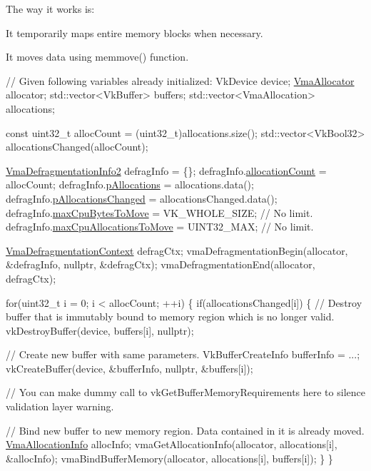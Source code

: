 The way it works is\+:


\begin{DoxyItemize}
\item It temporarily maps entire memory blocks when necessary.
\item It moves data using {\ttfamily memmove()} function.
\end{DoxyItemize}


\begin{DoxyCode}
\textcolor{comment}{// Given following variables already initialized:}
VkDevice device;
\hyperlink{structVmaAllocator}{VmaAllocator} allocator;
std::vector<VkBuffer> buffers;
std::vector<VmaAllocation> allocations;


\textcolor{keyword}{const} uint32\_t allocCount = (uint32\_t)allocations.size();
std::vector<VkBool32> allocationsChanged(allocCount);

\hyperlink{structVmaDefragmentationInfo2}{VmaDefragmentationInfo2} defragInfo = \{\};
defragInfo.\hyperlink{structVmaDefragmentationInfo2_a3cf86ab32c1da779b4923d301a3056ba}{allocationCount} = allocCount;
defragInfo.\hyperlink{structVmaDefragmentationInfo2_a8943f8d65969ce8e2189a1cdf3205e96}{pAllocations} = allocations.data();
defragInfo.\hyperlink{structVmaDefragmentationInfo2_a76d51a644dc7f5405d0cdd0025ecd0cc}{pAllocationsChanged} = allocationsChanged.data();
defragInfo.\hyperlink{structVmaDefragmentationInfo2_af78e1ea40c22d85137b65f6b384a4d0a}{maxCpuBytesToMove} = VK\_WHOLE\_SIZE; \textcolor{comment}{// No limit.}
defragInfo.\hyperlink{structVmaDefragmentationInfo2_a94c2c7223d52878445a8cccce396b671}{maxCpuAllocationsToMove} = UINT32\_MAX; \textcolor{comment}{// No limit.}

\hyperlink{structVmaDefragmentationContext}{VmaDefragmentationContext} defragCtx;
vmaDefragmentationBegin(allocator, &defragInfo, \textcolor{keyword}{nullptr}, &defragCtx);
vmaDefragmentationEnd(allocator, defragCtx);

\textcolor{keywordflow}{for}(uint32\_t i = 0; i < allocCount; ++i)
\{
    \textcolor{keywordflow}{if}(allocationsChanged[i])
    \{
        \textcolor{comment}{// Destroy buffer that is immutably bound to memory region which is no longer valid.}
        vkDestroyBuffer(device, buffers[i], \textcolor{keyword}{nullptr});

        \textcolor{comment}{// Create new buffer with same parameters.}
        VkBufferCreateInfo bufferInfo = ...;
        vkCreateBuffer(device, &bufferInfo, \textcolor{keyword}{nullptr}, &buffers[i]);

        \textcolor{comment}{// You can make dummy call to vkGetBufferMemoryRequirements here to silence validation layer
       warning.}

        \textcolor{comment}{// Bind new buffer to new memory region. Data contained in it is already moved.}
        \hyperlink{structVmaAllocationInfo}{VmaAllocationInfo} allocInfo;
        vmaGetAllocationInfo(allocator, allocations[i], &allocInfo);
        vmaBindBufferMemory(allocator, allocations[i], buffers[i]);
    \}
\}
\end{DoxyCode}


